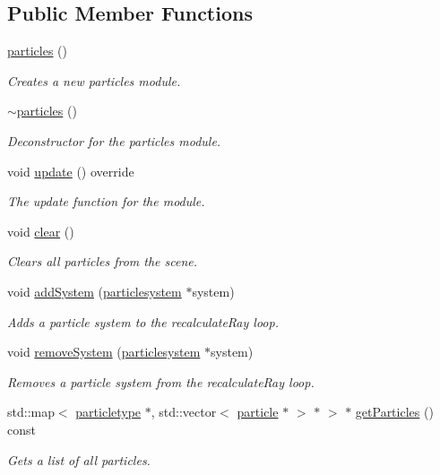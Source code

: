 \subsection*{Public Member Functions}
\begin{DoxyCompactItemize}
\item 
\hyperlink{classflounder_1_1particles_a252873bd7c1d03da7cfc09a7ff96e178}{particles} ()
\begin{DoxyCompactList}\small\item\em Creates a new particles module. \end{DoxyCompactList}\item 
\hyperlink{classflounder_1_1particles_a49776c1089c2291ee8144c0d4ef5ff59}{$\sim$particles} ()
\begin{DoxyCompactList}\small\item\em Deconstructor for the particles module. \end{DoxyCompactList}\item 
void \hyperlink{classflounder_1_1particles_a12f1dd9883cc49987f6ff0ca3105bdb6}{update} () override
\begin{DoxyCompactList}\small\item\em The update function for the module. \end{DoxyCompactList}\item 
void \hyperlink{classflounder_1_1particles_aba5f1d3ae0abf22fbc73463075e4777f}{clear} ()
\begin{DoxyCompactList}\small\item\em Clears all particles from the scene. \end{DoxyCompactList}\item 
void \hyperlink{classflounder_1_1particles_a39a6e05f1323ebf326930ef2e9b72a3e}{add\+System} (\hyperlink{classflounder_1_1particlesystem}{particlesystem} $\ast$system)
\begin{DoxyCompactList}\small\item\em Adds a particle system to the recalculate\+Ray loop. \end{DoxyCompactList}\item 
void \hyperlink{classflounder_1_1particles_a33af75a6466ece3ab1b661bcdffae201}{remove\+System} (\hyperlink{classflounder_1_1particlesystem}{particlesystem} $\ast$system)
\begin{DoxyCompactList}\small\item\em Removes a particle system from the recalculate\+Ray loop. \end{DoxyCompactList}\item 
std\+::map$<$ \hyperlink{classflounder_1_1particletype}{particletype} $\ast$, std\+::vector$<$ \hyperlink{classflounder_1_1particle}{particle} $\ast$ $>$ $\ast$ $>$ $\ast$ \hyperlink{classflounder_1_1particles_a6a78873c57f68dd35a464156cea4b05b}{get\+Particles} () const
\begin{DoxyCompactList}\small\item\em Gets a list of all particles. \end{DoxyCompactList}\end{DoxyCompactItemize}
